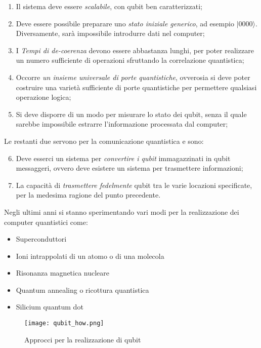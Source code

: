 \begin{enumerate}
  \item Il sistema deve essere \textit{scalabile}, con qubit ben caratterizzati;
  \item Deve essere possibile preparare uno \textit{stato iniziale generico}, ad esempio \(| 0000 \rangle \). Diversamente, sarà impossibile introdurre dati nel computer;
  \item I \textit{Tempi di de-coerenza} devono essere abbastanza lunghi, per poter realizzare un numero sufficiente di operazioni sfruttando la correlazione quantistica;
  \item Occorre \textit{un insieme universale di porte quantistiche}, ovverosia si deve poter costruire una varietà sufficiente di porte quantistiche per permettere qualsiasi operazione logica;
  \item Si deve disporre di un modo per misurare lo stato dei qubit, senza il quale sarebbe impossibile estrarre l'informazione processata dal computer;
\end{enumerate}

Le restanti due servono per la comunicazione quantistica e sono:

\begin{enumerate}
  \setcounter{enumi}{5}
  \item Deve esserci un sistema per \textit{convertire i qubit} immagazzinati in qubit messaggeri, ovvero deve esistere un sistema per trasmettere informazioni;
  \item La capacità di \textit{trasmettere fedelmente} qubit tra le varie locazioni specificate, per la medesima ragione del punto precedente.
\end{enumerate}

Negli ultimi anni si stanno sperimentando vari modi per la realizzazione dei computer quantistici come:
\begin{itemize}
  \item Superconduttori
  \item Ioni intrappolati di un atomo o di una molecola
  \item Risonanza magnetica nucleare
  \item Quantum annealing o ricottura quantistica
  \item Silicium quantum dot
\end{itemize}

\begin{figure}[htbp]
  \centering
  \texttt{[image: qubit\_how.png]}
  \caption{Approcci per la realizzazione di qubit}
  \label{fig:qubit_how}
\end{figure}

